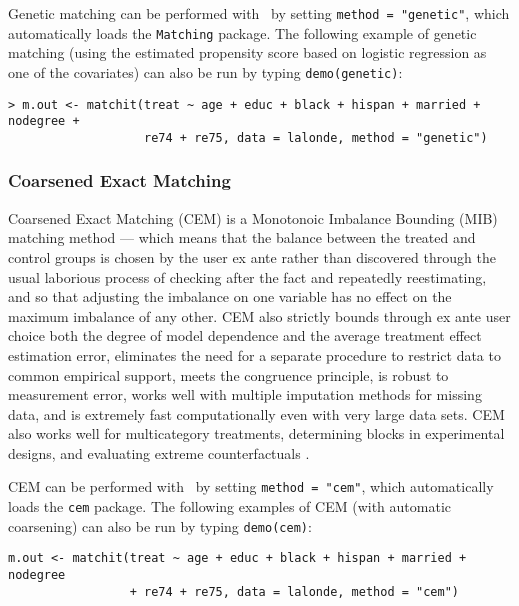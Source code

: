 Genetic matching can be performed with \MatchIt\ by setting
\texttt{method = "genetic"}, which automatically loads the
\texttt{Matching} \citep{Sekhon04} package.  The following example of
genetic matching (using the estimated propensity score based on
logistic regression as one of the covariates) can also be run by
typing {\tt demo(genetic)}:
\begin{verbatim}
> m.out <- matchit(treat ~ age + educ + black + hispan + married + nodegree + 
                   re74 + re75, data = lalonde, method = "genetic")
\end{verbatim}


\subsubsection{Coarsened Exact Matching}
\label{subsub:cem}

Coarsened Exact Matching (CEM) is a Monotonoic Imbalance Bounding
(MIB) matching method --- which means that the balance between the
treated and control groups is chosen by the user ex ante rather than
discovered through the usual laborious process of checking after the
fact and repeatedly reestimating, and so that adjusting the imbalance
on one variable has no effect on the maximum imbalance of any other.
CEM also strictly bounds through ex ante user choice both the degree
of model dependence and the average treatment effect estimation error,
eliminates the need for a separate procedure to restrict data to
common empirical support, meets the congruence principle, is robust to
measurement error, works well with multiple imputation methods for
missing data, and is extremely fast computationally even with very
large data sets.  CEM also works well for multicategory treatments,
determining blocks in experimental designs, and evaluating extreme
counterfactuals \citep{IacKinPor08}.

CEM can be performed with \MatchIt\ by setting \texttt{method =
  "cem"}, which automatically loads the \texttt{cem} package.  The
following examples of CEM (with automatic coarsening) can also be run
by typing \texttt{demo(cem)}:
\begin{verbatim}
m.out <- matchit(treat ~ age + educ + black + hispan + married + nodegree 
                 + re74 + re75, data = lalonde, method = "cem")
\end{verbatim}


